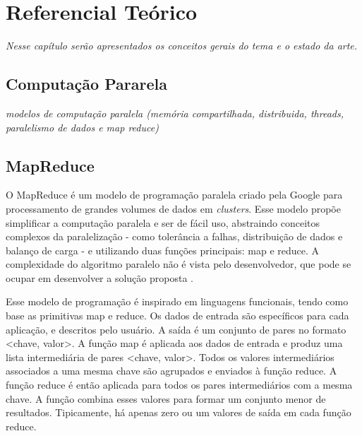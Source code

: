 \chapter{Referencial Teórico}
\label{cap:referencial}


\textit{Nesse capítulo serão apresentados os conceitos gerais do tema e o estado da arte. }

\section{Computação Pararela}

\textit{modelos de computação paralela (memória compartilhada, distribuida, threads, paralelismo de dados e map reduce)}
\section{MapReduce}

O MapReduce  é um modelo de programação paralela criado pela Google para processamento de grandes volumes de dados em \textit{clusters}. Esse modelo propõe simplificar a computação paralela e ser de fácil uso, abstraindo conceitos complexos da paralelização - como tolerância a falhas, distribuição de dados e balanço de carga - e utilizando duas funções principais: map e reduce. A complexidade do algoritmo paralelo não é vista pelo desenvolvedor, que pode se ocupar em desenvolver a solução proposta \cite{Dean:2008}. 

Esse modelo de programação é inspirado em linguagens funcionais, tendo como base as primitivas map e reduce.
Os dados de entrada são específicos para cada aplicação, e descritos pelo usuário. A saída é um conjunto de pares no formato <chave, valor>. 
A função map é aplicada aos dados de entrada e produz uma lista intermediária de pares <chave, valor>. Todos os valores intermediários associados a uma mesma chave são agrupados e enviados à função reduce. 
A função reduce é então aplicada para todos os pares intermediários com a mesma chave. A função combina esses valores para formar um conjunto menor de resultados. 
Tipicamente, há apenas zero ou um valores de saída em cada função reduce. 

